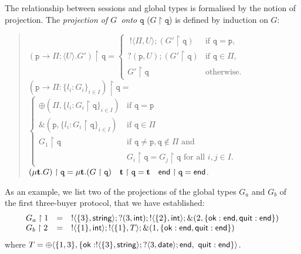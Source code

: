 \documentclass[a4paper,11pt,twoside]{report}
\newcommand{\kf}[1]{\textup{\textsf{#1}}\xspace}
\newcommand{\Ia}{\ensuremath{a}}
\newcommand{\Ib}{\ensuremath{b}}
\newcommand{\pset}{\ensuremath{\Pi}}
\newcommand{\participant}[1]{\ensuremath{\mathtt{#1}}}
\newcommand{\q}{\ensuremath{\participant{q}}}
\newcommand{\p}{\ensuremath{\participant{p}}}
\newcommand{\anglep}[2]{\ensuremath{\langle #1, #2\rangle}}
\newcommand{\set}[1]{\ensuremath{\{#1\}}}
\newcommand{\G}{\ensuremath{G}}
\newcommand{\Gv}[4]{\ensuremath{#1\to\pset:\langle#3\rangle.#4}}
\newcommand{\U}{\ensuremath{U}}
\newcommand{\pro}[2]{\ensuremath{#1\upharpoonright#2}}
\newcommand{\T}{\ensuremath{T}}
\newcommand{\UT}{\ensuremath{U}}
\newcommand{\oT}[2]{\ensuremath{\;!\langle #2,#1\rangle}}
\newcommand{\iT}[2]{\ensuremath{?( #2,#1 )}}
\newcommand{\ty}{\textbf{t}}
\newcommand{\End}{\kf{end}}
\newcommand{\seltypeG}{\ensuremath{\oplus(\pset,\{l_i:\pro{\G_i}\q\}_{i\in I})}}
\newcommand{\branchtypeG}{\ensuremath{\&(\p,\{l_i:\pro{\G_i}\q\}_{i\in I})}}
\begin{document}
The relationship between sessions and global types is formalised by the notion of projection. The {\em projection of \G\ onto \q} (\pro\G\q) is defined by induction on \G: 
\begin{quote}
{\small
$\pro{(\Gv\p\p\U{\G'})}\q=\begin{cases}
  \oT\UT{\pset};(\pro{\G'}\q)  & \text{if }\q=\p, \\
  \iT\UT{\p};(\pro{\G'}\q) & \text{if }\q\in\pset, \\
   \pro{\G'}\q & \text{otherwise}.
\end{cases}$\\
$\pro{(\p\rightarrow\pset:\{l_i:\G_i\}_{i\in I})}\q=$\\
\mbox{\qquad \qquad \qquad} $
 \begin{cases}
  \seltypeG & \text{if }\q=\p\\
  \branchtypeG& \text{if }\q\in\pset \\
   \pro{\G_1}\q  &\text{if }\q\not=\p,  \q\not\in\pset\text{ and }\\
     & \pro{\G_i}\q=\pro{\G_j}\q
   \text{ for all }i,j\in I.\end{cases}
$\\
$\pro{(\mu \ty.\G)}\q= \mu \ty.(\pro{\G}\q) \quad \pro\ty\q=\ty\quad\pro\End\q=
         \End$.\\[0.5mm]
}
\end{quote}

As an example, we list two of the projections of the global types $\G_\Ia$ and $\G_\Ib$ of the first three-buyer protocol, that we have established:
\[\begin{array}{lll}
 \pro{\G_\Ia}1&=& !\langle \{3\},\kf{string}\rangle;?( 3,\kf{int}); !\langle \{2\},\kf{int}\rangle;\&(2,\{\kf{ok}: \End , \kf{quit}: \End\})\\
\pro{\G_\Ib}2&=& !\langle \{1\},\kf{int}\rangle;!\langle \{1\},T\rangle;\&(1,\{\kf{ok}: \End , \kf{quit}: \End\})\\
\end{array}\]
\noindent
where $\T=\oplus\anglep{\set{1,3}}{\{\kf{ok}:!\langle \{3\},\kf{string}\rangle; ?\langle 3,\kf{date}\rangle; \End,\ \kf{quit}: \End\}}$.\\
\end{document}
